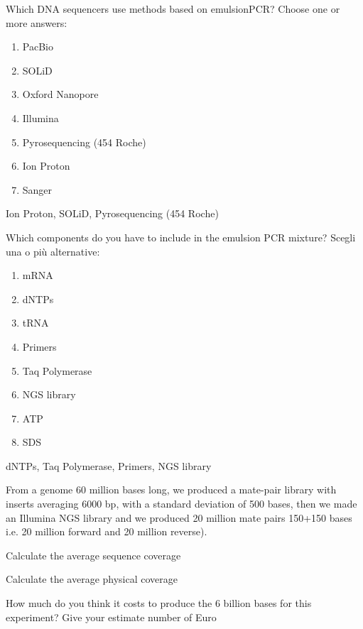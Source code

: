 \begin{Exercise} [
  label={ex28},
  origin={G. Valle}
 ]

\Question Which DNA sequencers use methods based on emulsionPCR?
Choose one or more answers:
\begin{enumerate}
\item PacBio
\item SOLiD
\item Oxford Nanopore
\item Illumina
\item Pyrosequencing (454 Roche)
\item Ion Proton
\item Sanger
\end{enumerate}

\end{Exercise}

\begin{Answer} [
  ref={ex28},
  number={1}
 ]

\Question Ion Proton, SOLiD, Pyrosequencing (454 Roche)

\end{Answer}

\begin{Exercise} [
  label={ex29},
  origin={G. Valle}
 ]

\Question Which components do you have to include in the emulsion PCR mixture?
Scegli una o più alternative:
\begin{enumerate}
\item mRNA
\item dNTPs
\item tRNA
\item Primers
\item Taq Polymerase
\item NGS library
\item ATP
\item SDS
\end{enumerate}

\end{Exercise}

\begin{Answer} [
  ref={ex29},
  number={1}
 ]

\Question dNTPs, Taq Polymerase, Primers, NGS library

\end{Answer}

\begin{Exercise} [
  label={ex30},
  origin={G. Valle}
 ]

From a genome 60 million bases long, we produced a mate-pair library with
inserts averaging 6000 bp, with a standard deviation of 500 bases, then we made
an Illumina NGS library and we produced 20 million mate pairs 150+150 bases 
i.e. 20 million forward and 20 million reverse).

\Question Calculate the average sequence coverage

\Question Calculate the average physical coverage

\Question How much do you think it costs to produce the 6 billion bases for
this experiment?  Give your estimate number of Euro

\end{Exercise}

